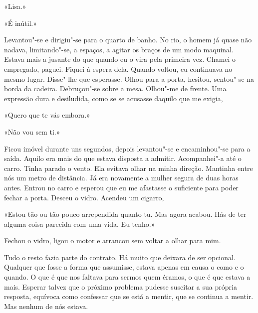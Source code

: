 «Lisa.»

«É inútil.»

Levantou"-se e dirigiu"-se para o quarto de banho. No rio, o homem já
quase não nadava, limitando"-se, a espaços, a agitar os braços de um
modo maquinal. Estava mais a jusante do que quando eu o vira pela
primeira vez. Chamei o empregado, paguei. Fiquei à espera dela. Quando
voltou, eu continuava no mesmo lugar. Disse"-lhe que esperasse. Olhou
para a porta, hesitou, sentou"-se na borda da cadeira. Debruçou"-se
sobre a mesa. Olhou"-me de frente. Uma expressão dura e desiludida, como
se se acusasse daquilo que me exigia,

«Quero que te vás embora.»

«Não vou sem ti.»

Ficou imóvel durante uns segundos, depois levantou"-se e encaminhou"-se
para a saída. Aquilo era mais do que estava disposta a admitir.
Acompanhei"-a até o carro. Tinha parado o vento. Ela evitava olhar na
minha direção. Mantinha entre nós um metro de distância. Já era
novamente a mulher segura de duas horas antes. Entrou no carro e esperou
que eu me afastasse o suficiente para poder fechar a porta. Desceu o
vidro. Acendeu um cigarro,

«Estou tão ou tão pouco arrependida quanto tu. Mas agora acabou. Hás de
ter alguma coisa parecida com uma vida. Eu tenho.»

Fechou o vidro, ligou o motor e arrancou sem voltar a olhar para mim.

Tudo o resto fazia parte do contrato. Há muito que deixara de ser
opcional. Qualquer que fosse a forma que assumisse, estava apenas em
causa o como e o quando. O que é que nos faltava para sermos quem
éramos, o que é que estava a mais. Esperar talvez que o próximo problema
pudesse suscitar a sua própria resposta, equívoca como confessar que se
está a mentir, que se continua a mentir. Mas nenhum de nós estava.

